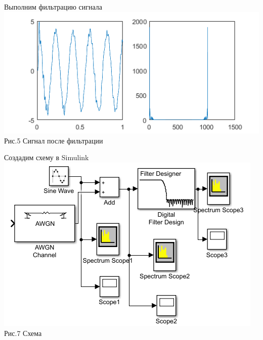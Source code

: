 \documentclass[a4paper,12pt]{article}
\begin{document}
Выполним фильтрацию сигнала
\center\includegraphics{pictures/filt_sig.png} \\ Рис.5 Сигнал после фильтрации

Создадим схему в Simulink
\center\includegraphics{pictures/simul.png} \\ Рис.7 Схема
\end{document}

